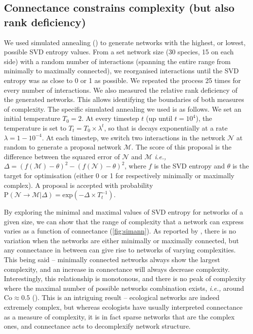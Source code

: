 \begin{refsection}
\subsection{Connectance constrains complexity (but also rank
deficiency)}\label{connectance-constrains-complexity-but-also-rank-deficiency}

We used simulated annealing (\cite{Kirkpatrick1984OptSim}) to generate networks
with the highest, or lowest, possible SVD entropy values. From a set network
size (30 species, 15 on each side) with a random number of interactions
(spanning the entire range from minimally to maximally connected), we
reorganised interactions until the SVD entropy was as close to 0 or 1 as
possible. We repeated the process 25 times for every number of interactions. We
also measured the relative rank deficiency of the generated networks. This
allows identifying the boundaries of both measures of complexity. The specific
simulated annealing we used is as follows. We set an initial temperature \(T_0 =
2\). At every timestep \(t\) (up until \(t = 10^4\)), the temperature is set to
\(T_t = T_0\times\lambda^t\), so that is decays exponentially at a rate
\(\lambda = 1 - 10^{-4}\). At each timestep, we switch two interactions in the
network \(\mathcal{N}\) at random to generate a proposal network
\(\mathcal{M}\). The score of this proposal is the difference between the
squared error of \(\mathcal{N}\) and \(\mathcal{M}\) \emph{i.e.,} \(\Delta =
(f(\mathcal{M})-\theta)^2-(f(\mathcal{N})-\theta)^2\), where \(f\) is the SVD
entropy and \(\theta\) is the target for optimisation (either 0 or 1 for
respectively minimally or maximally complex). A proposal is accepted with
probability \(\text{P}(\mathcal{N} \rightarrow \mathcal{M} | \Delta) =
\text{exp}\left(-\Delta\times T_t^{-1}\right)\).

By exploring the minimal and maximal values of SVD entropy for networks of a
given size, we can show that the range of complexity that a network can express
varies as a function of connectance (\autoref{fig:simann}). As reported by
\cite{Poisot2014WheEco}, there is no variation when the networks are
either minimally or maximally connected, but any connectance in between can give
rise to networks of varying complexities. This being said -- minimally connected
networks always show the largest complexity, and an increase in connectance will
always decrease complexity. Interestingly, this relationship is monotonous, and
there is no peak of complexity where the maximal number of possible networks
combination exists, \emph{i.e.,} around \(\text{Co} \approx 0.5\)
(\cite{Poisot2014WheEco}). This is an intriguing result -- ecological networks are
indeed extremely complex, but whereas ecologists have usually interpreted
connectance as a measure of complexity, it is in fact sparse networks that are
the complex ones, and connectance acts to decomplexify network structure.


\end{refsection}
